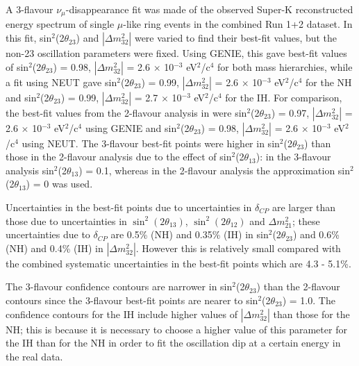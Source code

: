 A 3-flavour $\nu_{\mu}$-disappearance fit was made of the observed Super-K reconstructed energy spectrum of 
single $\mu$-like ring events in the combined Run 1+2 dataset. In this fit, sin$^{2}$(2$\theta_{23}$) and 
$|\Delta m^{2}_{32}|$ were varied to find their best-fit values, but the non-23 oscillation parameters were 
fixed. Using GENIE, this gave best-fit values of 
sin$^{2}$(2$\theta_{23}$) = 0.98, $|\Delta m^{2}_{32}|$ = 2.6 $\times$ 10$^{-3}$ eV$^{2}$/c$^{4}$ for both mass 
hierarchies, while a fit using NEUT gave sin$^{2}$(2$\theta_{23}$) = 0.99, $|\Delta m^{2}_{32}|$ 
= 2.6 $\times$ 10$^{-3}$ eV$^{2}$/c$^{4}$ for the NH and sin$^{2}$(2$\theta_{23}$) = 0.99, $|\Delta m^{2}_{32}|$
= 2.7 $\times$ 10$^{-3}$ eV$^{2}$/c$^{4}$ for the IH. For comparison, the best-fit values from the 2-flavour 
analysis in \cite{OurRun1and2Analysis2F} were sin$^{2}$(2$\theta_{23}$) = 0.97, $|\Delta m^{2}_{32}|$ 
= 2.6 $\times$ 10$^{-3}$ eV$^{2}$/c$^{4}$ using GENIE and sin$^{2}$(2$\theta_{23}$) = 0.98, $|\Delta m^{2}_{32}|$ 
= 2.6 $\times$ 10$^{-3}$ eV$^{2}$/c$^{4}$ using NEUT. The 3-flavour best-fit points were higher in sin$^{2}$(2$\theta_{23}$) 
than those in the 2-flavour analysis due to the effect of sin$^{2}$(2$\theta_{13}$): in the 3-flavour analysis 
sin$^{2}$(2$\theta_{13}$) = 0.1, whereas in the 2-flavour analysis the approximation sin$^{2}$(2$\theta_{13}$) 
= 0 was used.

Uncertainties in the best-fit points due to uncertainties in $\delta_{CP}$ are larger than those due to 
uncertainties in $\sin^{2}(2 \theta_{13})$, $\sin^{2}(2 \theta_{12})$ and $\Delta m_{21}^{2}$; these uncertainties 
due to $\delta_{CP}$ are 0.5\% (NH) and 0.35\% (IH) in sin$^{2}$(2$\theta_{23}$) and 0.6\% (NH) and 0.4\% (IH) in 
$|\Delta m^{2}_{32}|$. However this is relatively small compared with the combined systematic uncertainties in 
the best-fit points which are 4.3 - 5.1\%.

The 3-flavour confidence contours are narrower in sin$^{2}$(2$\theta_{23}$) than the 2-flavour contours 
since the 3-flavour best-fit points are nearer to sin$^{2}$(2$\theta_{23}$) = 1.0. The confidence contours 
for the IH include higher values of $|\Delta m^{2}_{32}|$ than those for the NH; this is because it is necessary 
to choose a higher value of this parameter for the IH than for the NH in order to fit the oscillation dip at a 
certain energy in the real data. 



